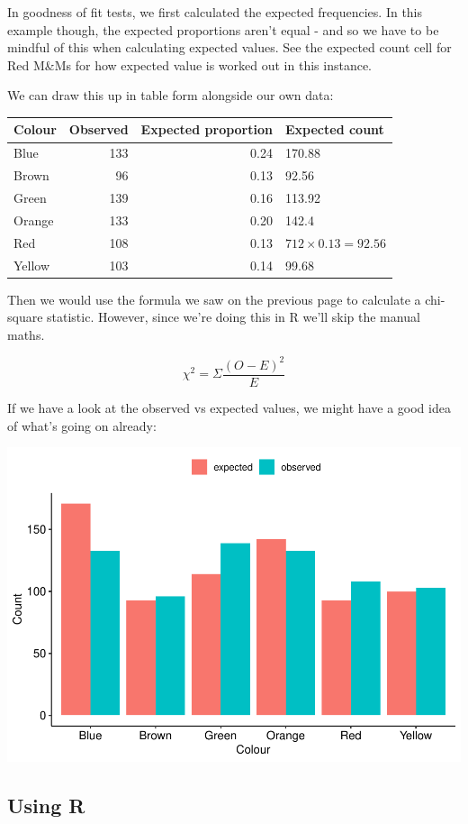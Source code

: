\documentclass[
]{book}
\begin{document}
In goodness of fit tests, we first calculated the expected frequencies. In this example though, the expected proportions aren't equal - and so we have to be mindful of this when calculating expected values. See the expected count cell for Red M\&Ms for how expected value is worked out in this instance.

We can draw this up in table form alongside our own data:

\begin{tabular}{l|r|r|l}
\hline
Colour & Observed & Expected proportion & Expected count\\
\hline
Blue & 133 & 0.24 & 170.88\\
\hline
Brown & 96 & 0.13 & 92.56\\
\hline
Green & 139 & 0.16 & 113.92\\
\hline
Orange & 133 & 0.20 & 142.4\\
\hline
Red & 108 & 0.13 & $712 \times 0.13 = 92.56$\\
\hline
Yellow & 103 & 0.14 & 99.68\\
\hline
\end{tabular}

Then we would use the formula we saw on the previous page to calculate a chi-square statistic. However, since we're doing this in R we'll skip the manual maths.

\[
\chi^2 = \Sigma \frac{(O-E)^2}{E}
\]

If we have a look at the observed vs expected values, we might have a good idea of what's going on already:

\includegraphics{_main_files/figure-latex/unnamed-chunk-102-1.pdf}

\hypertarget{using-r}{%
\subsection{Using R}\label{using-r}}
\end{document}
